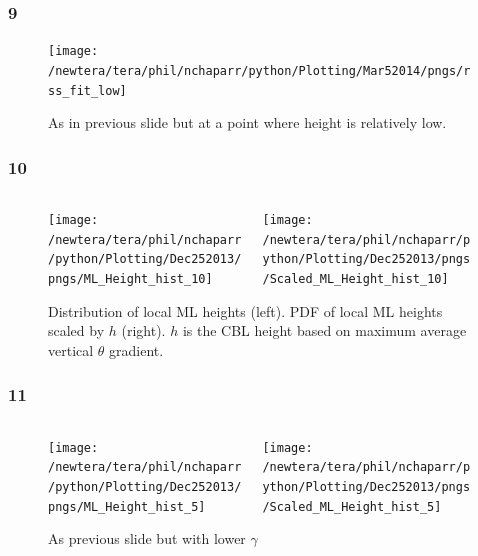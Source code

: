 \documentclass{beamer}
\newcommand\FrameText[1]{
\begin{textblock}{16}(1,2.5)
\raggedright #1
\end{textblock}}
\begin{document}
\begin{frame}
\frametitle{9}

\begin{figure}
\fontsize{12pt}{7.2}\selectfont
\centering
\texttt{[image: /newtera/tera/phil/nchaparr/python/Plotting/Mar52014/pngs/rss\_fit\_low]}
\caption{As in previous slide but at a point where height is relatively low.}
\end{figure}
\end{frame}

\begin{frame}
\frametitle{10}
\fontsize{12pt}{7.2}\selectfont
\begin{figure}
\begin{columns}[T]
   \begin{column}{.5\textwidth}
   \centering
   \texttt{[image: /newtera/tera/phil/nchaparr/python/Plotting/Dec252013/pngs/ML\_Height\_hist\_10]} 
   \end{column} 
   
   \begin{column}{.5\textwidth}
    \centering
    \texttt{[image: /newtera/tera/phil/nchaparr/python/Plotting/Dec252013/pngs/Scaled\_ML\_Height\_hist\_10]}
   \end{column}     
\end{columns}
\caption{Distribution of local ML heights (left).  PDF of local ML heights scaled by $h$ (right).  $h$ is the CBL height based on maximum average  vertical $\theta$ gradient.}
\end{figure}
\end{frame}

\begin{frame}
\frametitle{11}
\fontsize{12pt}{7.2}\selectfont
\begin{figure}
\begin{columns}[T]
   \begin{column}{.5\textwidth}
   \texttt{[image: /newtera/tera/phil/nchaparr/python/Plotting/Dec252013/pngs/ML\_Height\_hist\_5]} 
   \end{column} 
   
   \begin{column}{.5\textwidth}
    \texttt{[image: /newtera/tera/phil/nchaparr/python/Plotting/Dec252013/pngs/Scaled\_ML\_Height\_hist\_5]}
   \end{column}     
\end{columns}
\caption{As previous slide but with lower $\gamma$}
\end{figure}
\end{frame}
\end{document}
